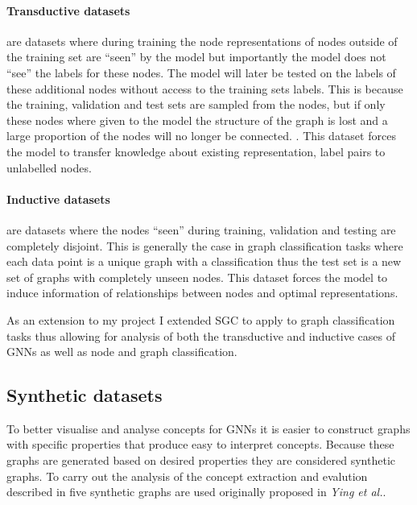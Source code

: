 \paragraph{Transductive datasets} are datasets where during training the node representations of nodes outside of the training set are ``seen'' by the model but importantly the model does not ``see'' the labels for these nodes.
The model will later be tested on the labels of these additional nodes without access to the training sets labels.
This is because the training, validation and test sets are sampled from the nodes, but if only these nodes where given to the model the structure of the graph is lost and a large proportion of the nodes will no longer be connected.
.
This dataset forces the model to transfer knowledge about existing representation, label pairs to unlabelled nodes.

\paragraph{Inductive datasets} are datasets where the nodes ``seen'' during training, validation and testing are completely disjoint.
This is generally the case in graph classification tasks where each data point is a unique graph with a classification thus the test set is a new set of graphs with completely unseen nodes.
This dataset forces the model to induce information of relationships between nodes and optimal representations.

As an extension to my project I extended SGC to apply to graph classification tasks thus allowing for analysis of both the transductive and inductive cases of GNNs as well as node and graph classification.

\subsection{Synthetic datasets}
\label{sec:synth}


To better visualise and analyse concepts for GNNs it is easier to construct graphs with specific properties that produce easy to interpret concepts.
Because these graphs are generated based on desired properties they are considered synthetic graphs.
To carry out the analysis of the concept extraction and evalution described in  five synthetic graphs are used originally proposed in \textit{Ying et al.}\cite{ying2019gnnexplainer}.

